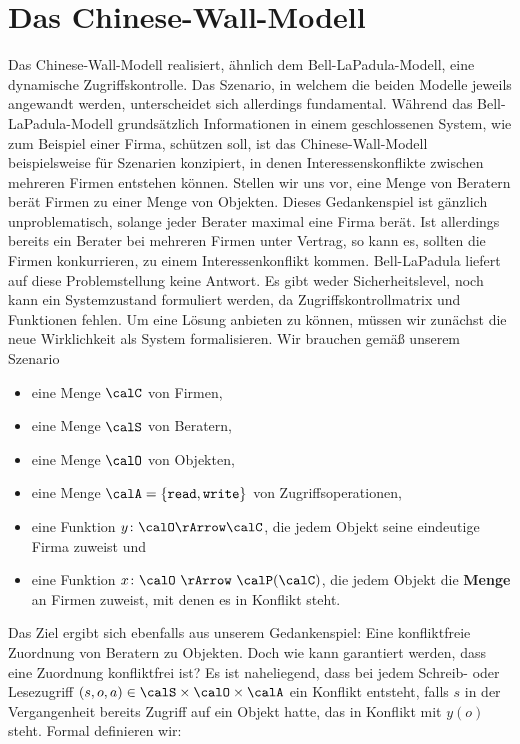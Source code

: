 \section{Das Chinese-Wall-Modell}
Das Chinese-Wall-Modell realisiert, ähnlich dem Bell-LaPadula-Modell, eine dynamische Zugriffskontrolle. Das Szenario, in welchem die beiden Modelle jeweils angewandt werden, unterscheidet sich allerdings fundamental.
Während das Bell-LaPadula-Modell grundsätzlich Informationen in einem geschlossenen System, wie zum Beispiel einer Firma, schützen soll, ist das Chinese-Wall-Modell beispielsweise für Szenarien konzipiert, in denen Interessenskonflikte zwischen mehreren Firmen entstehen können.
Stellen wir uns vor, eine Menge von Beratern berät Firmen zu einer Menge von Objekten. Dieses Gedankenspiel ist gänzlich unproblematisch, solange jeder Berater maximal eine Firma berät. Ist allerdings bereits ein Berater bei mehreren Firmen unter Vertrag, so kann es, sollten die Firmen konkurrieren, zu einem Interessenkonflikt kommen. Bell-LaPadula liefert auf diese Problemstellung keine Antwort. Es gibt weder Sicherheitslevel, noch kann ein Systemzustand formuliert werden, da Zugriffskontrollmatrix und Funktionen fehlen.
Um eine Lösung anbieten zu können, müssen wir zunächst die neue Wirklichkeit als System formalisieren. Wir brauchen gemäß unserem Szenario

\begin{itemize}
	\item eine Menge $\calC$ von Firmen,
	\item eine Menge $\calS$ von Beratern,
	\item eine Menge $\calO$ von Objekten,
	\item eine Menge $\calA = \{\texttt{read}, \texttt{write}\}$ von Zugriffsoperationen, 
	\item eine Funktion $y\colon \calO \rArrow \calC$, die jedem Objekt seine eindeutige Firma zuweist und
	\item eine Funktion $x\colon \calO\ \rArrow\ \calP(\calC)$, die jedem Objekt die \textbf{Menge} an Firmen zuweist, mit denen es in Konflikt steht.
\end{itemize}

Das Ziel ergibt sich ebenfalls aus unserem Gedankenspiel: Eine konfliktfreie Zuordnung von Beratern zu Objekten. Doch wie kann garantiert werden, dass eine Zuordnung konfliktfrei ist? %
Es ist naheliegend, dass bei jedem Schreib- oder Lesezugriff $(s, o, a) \in \calS \times \calO \times \calA$ ein Konflikt entsteht, falls \(s\) in der Vergangenheit bereits Zugriff auf ein Objekt hatte, das in Konflikt mit \(y(o)\) steht. Formal definieren wir: 

